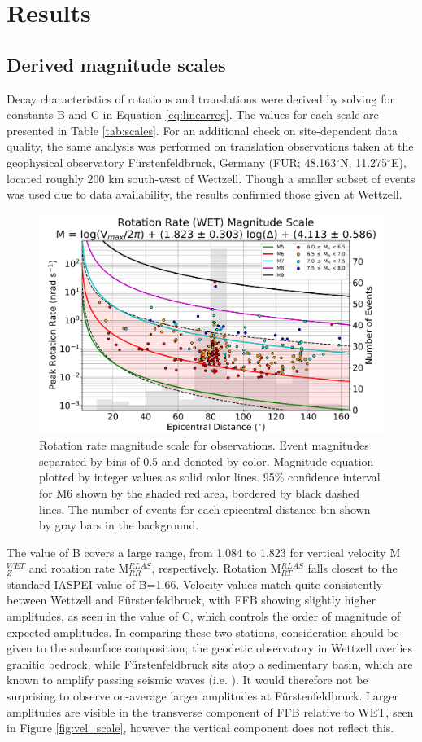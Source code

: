 \documentclass{gji}
\begin{document}
\section{Results}\label{sec:results}
\subsection{Derived magnitude scales}
Decay characteristics of rotations and translations were derived by solving for constants B and C in Equation \ref{eq:linearreg}. The values for each scale are presented in Table \ref{tab:scales}. For an additional check on site-dependent data quality, the same analysis was performed on translation observations taken at the geophysical observatory F\"urstenfeldbruck, Germany (FUR; 48.163$^\circ$N, 11.275$^\circ$E), located roughly 200 km south-west of Wettzell. Though a smaller subset of events was used due to data availability, the results confirmed those given at Wettzell. 


\begin{figure}
\centerline{\includegraphics[width=.8\textwidth]{RR_WET}}
\caption{Rotation rate magnitude scale for observations. Event magnitudes separated by bins of 0.5 and denoted by color. Magnitude equation plotted by integer values as solid color lines. 95\% confidence interval for M6 shown by the shaded red area, bordered by black dashed lines. The number of events for each epicentral distance bin shown by gray bars in the background.}
\label{fig:rr_obs}
\end{figure}

The value of B covers a large range, from 1.084 to 1.823 for vertical velocity M$^{WET}_{Z}$ and rotation rate M$^{RLAS}_{RR}$, respectively. Rotation M$^{RLAS}_{RT}$ falls closest to the standard IASPEI value of B=1.66. Velocity values match quite consistently between Wettzell and F\"urstenfeldbruck, with FFB showing slightly higher amplitudes, as seen in the value of C, which controls the order of magnitude of expected amplitudes. In comparing these two stations, consideration should be given to the subsurface composition; the geodetic observatory in Wettzell overlies granitic bedrock, while F\"urstenfeldbruck sits atop a sedimentary basin, which are known to amplify passing seismic waves (i.e. \cite{rial1992earthquake}). It would therefore not be surprising to observe on-average larger amplitudes at F\"urstenfeldbruck. Larger amplitudes are visible in the transverse component of FFB relative to WET, seen in Figure \ref{fig:vel_scale}, however the vertical component does not reflect this. 
\end{document}
